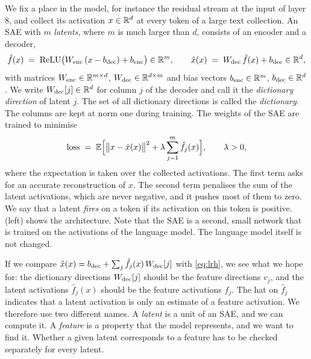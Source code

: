 We fix a place in the model, for instance the residual stream at the input of layer 8, and collect its
activation $x\in\mathbb{R}^d$ at every token of a large text collection. An SAE with $m$ \emph{latents}, where $m$ is
much larger than $d$, consists of an encoder and a decoder,
\begin{equation}\label{eq:sae}
\hat f(x) \;=\; \mathrm{ReLU}\big(W_{\mathrm{enc}}\,(x-b_{\mathrm{dec}})+b_{\mathrm{enc}}\big)\in\mathbb{R}^m,\qquad
\hat x(x) \;=\; W_{\mathrm{dec}}\,\hat f(x)+b_{\mathrm{dec}}\in\mathbb{R}^d ,
\end{equation}
with matrices $W_{\mathrm{enc}}\in\mathbb{R}^{m\times d}$, $W_{\mathrm{dec}}\in\mathbb{R}^{d\times m}$ and bias vectors $b_{\mathrm{enc}}\in\mathbb{R}^m$, $b_{\mathrm{dec}}\in\mathbb{R}^d$.
We write $W_{\mathrm{dec}}[j]\in\mathbb{R}^d$ for column $j$ of the decoder and call it the \emph{dictionary direction} of latent
$j$. The set of all dictionary directions is called the \emph{dictionary}. The columns are kept at norm one during
training. The weights of the SAE are trained to minimise
\begin{equation}\label{eq:saeloss}
\text{loss} \;=\; \mathbb{E}\Big[\big\|x-\hat x(x)\big\|^2+\lambda\sum_{j=1}^{m}\hat f_j(x)\Big],\qquad\lambda>0,
\end{equation}
where the expectation is taken over the collected activations. The first term asks for an accurate
reconstruction of $x$. The second term penalises the sum of the latent activations, which are never negative, and
it pushes most of them to zero. We say that a latent \emph{fires} on a token if its activation on this token is
positive.  (left) shows the architecture. Note that the SAE is a second, small network that is trained
on the activations of the language model. The language model itself is not changed.

If we compare $\hat x(x)=b_{\mathrm{dec}}+\sum_j\hat f_j(x)\,W_{\mathrm{dec}}[j]$ with \eqref{eq:lrh}, we see what we hope for: the
dictionary directions $W_{\mathrm{dec}}[j]$ should be the feature directions $v_j$, and the latent activations $\hat f_j(x)$
should be the feature activations $f_j$. The hat on $\hat f_j$ indicates that a latent activation is only an
estimate of a feature activation. We therefore use two different names. A \emph{latent} is a unit of an SAE, and we
can compute it. A \emph{feature} is a property that the model represents, and we want to find it. Whether a given
latent corresponds to a feature has to be checked separately for every latent.

